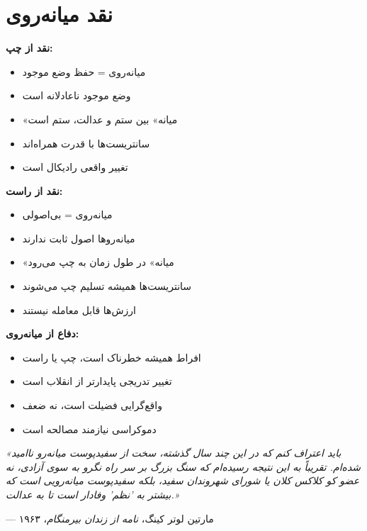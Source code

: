 \section{نقد میانه‌روی}

\begin{tcolorbox}[
    enhanced,
    colback=leftred!8,
    colframe=leftred,
    boxrule=1.5pt,
    arc=5pt,
    fonttitle=\bfseries,
    title={\rl{🔴 مناظره: میانه‌روی - فضیلت یا ضعف؟}}
]

\textbf{نقد از چپ:}
\begin{itemize}
    \item میانه‌روی = حفظ وضع موجود
    \item وضع موجود ناعادلانه است
    \item «میانه» بین ستم و عدالت، ستم است
    \item سانتریست‌ها با قدرت همراه‌اند
    \item تغییر واقعی رادیکال است
\end{itemize}



\textbf{نقد از راست:}
\begin{itemize}
    \item میانه‌روی = بی‌اصولی
    \item میانه‌روها اصول ثابت ندارند
    \item «میانه» در طول زمان به چپ می‌رود
    \item سانتریست‌ها همیشه تسلیم چپ می‌شوند
    \item ارزش‌ها قابل معامله نیستند
\end{itemize}


\vspace{3mm}
\textbf{دفاع از میانه‌روی:}
\begin{itemize}
    \item افراط همیشه خطرناک است، چپ یا راست
    \item تغییر تدریجی پایدارتر از انقلاب است
    \item واقع‌گرایی فضیلت است، نه ضعف
    \item دموکراسی نیازمند مصالحه است
\end{itemize}
\end{tcolorbox}

\begin{tcolorbox}[
    enhanced,
    colback=centergreen!10,
    colframe=centergreen,
    boxrule=1.5pt,
    arc=5pt,
    fonttitle=\bfseries,
    title={\rl{🟢 نقل‌قول: مارتین لوتر کینگ دربارهٔ میانه‌روها}}
]
\textit{«باید اعتراف کنم که در این چند سال گذشته، سخت از سفیدپوست میانه‌رو ناامید شده‌ام. تقریباً به این نتیجه رسیده‌ام که سنگ بزرگ بر سر راه نگرو به سوی آزادی، نه عضو کو کلاکس کلان یا شورای شهروندان سفید، بلکه سفیدپوست میانه‌رویی است که بیشتر به 'نظم' وفادار است تا به عدالت.»}

\hfill --- مارتین لوتر کینگ، \textit{نامه از زندان بیرمنگام}، ۱۹۶۳
\end{tcolorbox}

